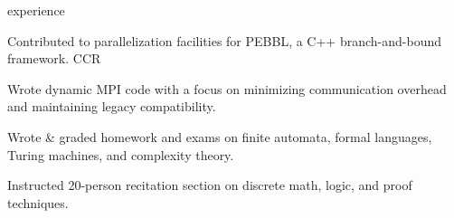 \documentclass{cv}
\begin{document}

\begin{cvsection}{experience}
  {
    \item Contributed to parallelization facilities for PEBBL, a C++ branch-and-bound framework. CCR
    \item Wrote dynamic MPI code with a focus on minimizing communication overhead and maintaining legacy compatibility.
  }
   {
     \item Wrote \& graded homework and exams on finite automata, formal languages, Turing machines, and complexity theory.
   }
   {
     \item Instructed 20-person recitation section on discrete math, logic, and proof techniques.
   }
\end{cvsection}
\end{document}
